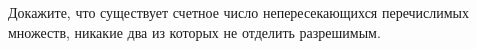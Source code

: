 Докажите, что существует счетное число непересекающихся перечислимых множеств, никакие два из которых не отделить
разрешимым.